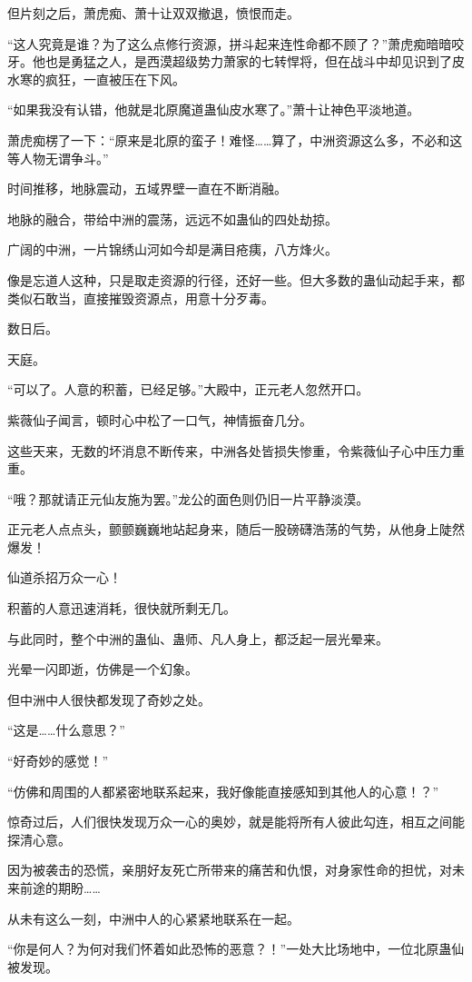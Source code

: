 \begin{this_body}
但片刻之后，萧虎痴、萧十让双双撤退，愤恨而走。

“这人究竟是谁？为了这么点修行资源，拼斗起来连性命都不顾了？”萧虎痴暗暗咬牙。他也是勇猛之人，是西漠超级势力萧家的七转悍将，但在战斗中却见识到了皮水寒的疯狂，一直被压在下风。

“如果我没有认错，他就是北原魔道蛊仙皮水寒了。”萧十让神色平淡地道。

萧虎痴楞了一下：“原来是北原的蛮子！难怪……算了，中洲资源这么多，不必和这等人物无谓争斗。”

时间推移，地脉震动，五域界壁一直在不断消融。

地脉的融合，带给中洲的震荡，远远不如蛊仙的四处劫掠。

广阔的中洲，一片锦绣山河如今却是满目疮痍，八方烽火。

像是忘道人这种，只是取走资源的行径，还好一些。但大多数的蛊仙动起手来，都类似石敢当，直接摧毁资源点，用意十分歹毒。

数日后。

天庭。

“可以了。人意的积蓄，已经足够。”大殿中，正元老人忽然开口。

紫薇仙子闻言，顿时心中松了一口气，神情振奋几分。

这些天来，无数的坏消息不断传来，中洲各处皆损失惨重，令紫薇仙子心中压力重重。

“哦？那就请正元仙友施为罢。”龙公的面色则仍旧一片平静淡漠。

正元老人点点头，颤颤巍巍地站起身来，随后一股磅礴浩荡的气势，从他身上陡然爆发！

仙道杀招万众一心！

积蓄的人意迅速消耗，很快就所剩无几。

与此同时，整个中洲的蛊仙、蛊师、凡人身上，都泛起一层光晕来。

光晕一闪即逝，仿佛是一个幻象。

但中洲中人很快都发现了奇妙之处。

“这是……什么意思？”

“好奇妙的感觉！”

“仿佛和周围的人都紧密地联系起来，我好像能直接感知到其他人的心意！？”

惊奇过后，人们很快发现万众一心的奥妙，就是能将所有人彼此勾连，相互之间能探清心意。

因为被袭击的恐慌，亲朋好友死亡所带来的痛苦和仇恨，对身家性命的担忧，对未来前途的期盼……

从未有这么一刻，中洲中人的心紧紧地联系在一起。

“你是何人？为何对我们怀着如此恐怖的恶意？！”一处大比场地中，一位北原蛊仙被发现。


\end{this_body}
